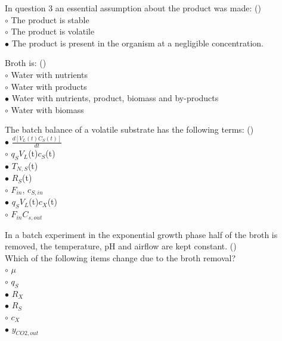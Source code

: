 \documentclass[]{beamer}
\begin{document}
\begin{frame}[shrink] {}
\addtocounter{answers}{1}
\color{blue}
In question 3 an essential assumption about the product was made: ()\\
\color{black}
\setlength{\parindent}{-0.4cm}
{\color{red}$\circ$}  The product is stable \\
{\color{red}$\circ$} The product is volatile \\
{\color{red}$\bullet$} The product is present in the organism at a negligible concentration.  \\
\end{frame}

\begin{frame}[shrink] {}
\addtocounter{answers}{1}
\color{blue}
Broth is: ()\\
\color{black}
\setlength{\parindent}{-0.4cm}
{\color{red}$\circ$}  Water with nutrients \\
{\color{red}$\circ$} Water with products \\
{\color{red}$\bullet$}  Water with nutrients, product, biomass and by-products \\
{\color{red}$\circ$} Water with biomass  \\
\end{frame}

\begin{frame}[shrink] {} 
\color{blue}
    
The batch balance of a volatile substrate has the following terms: ({\color{green}{Q6}})\\[0.5em]
\color{black}
\setlength{\parindent}{-0.4cm}
{\color{red}$\bullet$} $\frac{d[V_L(t)C_S(t)]}{dt}$  \\
{\color{red}$\circ$} $q_{S}$$V_{L}$(t)$c_{S}$(t)  \\
{\color{red}$\bullet$} $T_{N,S}$(t)  \\
{\color{red}$\bullet$} $R_{S}$(t)  \\
{\color{red}$\circ$} $F_{in}$, $c_{S,in}$  \\
{\color{red}$\bullet$} $q_{S}$$V_{L}$(t)$c_{X}$(t)  \\
{\color{red}$\circ$} $F_{in}$$C_{s,out}$  \\
\end{frame}


\begin{frame}[shrink] {} 
\color{blue}
  In a batch experiment in the exponential growth phase half of the broth is removed, the temperature, pH and airflow are kept constant.
 ({\color{green}{Q7}})\\
  Which of the following items change due to the broth removal?
  \\
\color{black}
\setlength{\parindent}{-0.4cm}
{\color{red}$\circ$} $\mu$  \\
{\color{red}$\circ$} $q_{S}$  \\
{\color{red}$\bullet$} $R_{X}$  \\
{\color{red}$\bullet$} $R_{S}$  \\
{\color{red}$\circ$} $c_{X}$  \\
{\color{red}$\bullet$} $y_{CO2,out}$  \\
\end{frame}
\end{document}
